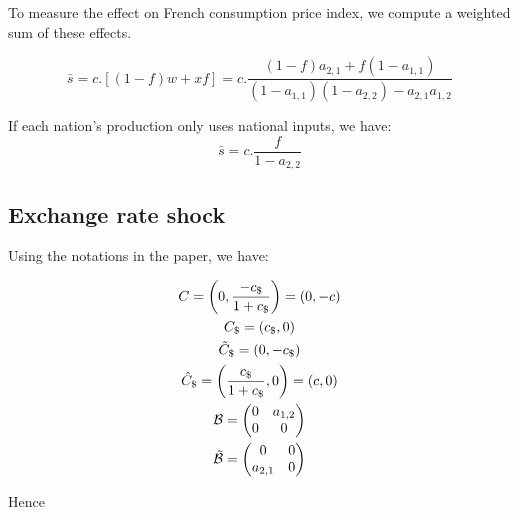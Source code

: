 \documentclass[11pt,a4paper]{article}
\begin{document}
\begin{appendices}
To measure the effect on French consumption price index, we compute a weighted sum of these effects.

\begin{equation}
\bar{s}=c.\left[\left(1-f\right)w+xf\right]=c.\frac{\left(1-f\right)a_{2,1}+f\left(1-a_{1,1}\right)}{\left(1-a_{1,1}\right)\left(1-a_{2,2}\right)-a_{2,1}a_{1,2}}
\end{equation}

If each nation's production only uses national inputs, we have:
\begin{equation*}
\bar{s}=c.\frac{f}{1-a_{2,2}}
\end{equation*}

\subsection{Exchange rate shock}

Using the notations in the paper, we have:

\begin{gather*}
C=\left(0,\frac{-c_\$}{1+c_\$}\right)=\left(0,-c\right)
\\
C_\$=\left(c_\$,0\right)
\\
\tilde{C}_\$=\left(0,-c_\$\right)
\\
\hat{C}_\$=\left(\frac{c_\$}{1+c_\$},0\right)=\left(c,0\right)
\\
{\cal B} = \left(\begin{matrix}0&a_{1,2}\\0&0\end{matrix}\right)
\\
\tilde{\cal B} = \left(\begin{matrix}0&0\\a_{2,1}&0\end{matrix}\right)
\end{gather*}

Hence


\end{appendices}
\end{document}
